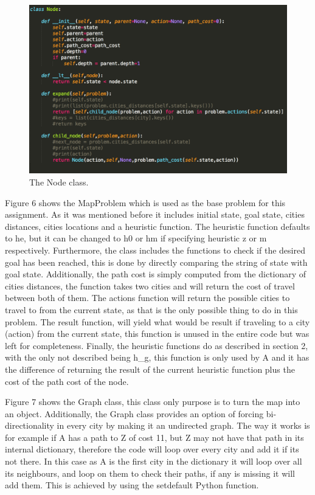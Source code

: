 \documentclass[12pt, letter]{article}
\begin{document}
\begin{figure}[htb]
  \centering
  \includegraphics[width=0.9 \textwidth]{./graphs/class_node.png}
  \caption{The Node class.}
\end{figure}

Figure 6 shows the MapProblem which is used as the base problem for this assignment. As it was mentioned before it includes initial state, goal state, cities distances, cities locations and a heuristic function. The heuristic function defaults to he, but it can be changed to h0 or hm if specifying heuristic z or m respectively. Furthermore, the class includes the functions to check if the desired goal has been reached, this is done by directly comparing the string of state with goal state. Additionally, the path cost is simply computed from the dictionary of cities distances, the function takes two cities and will return the cost of travel between both of them. The actions function will return the possible cities to travel to from the current state, as that is the only possible thing to do in this problem. The result function, will yield what would be result if traveling to a city (action) from the current state, this function is unused in the entire code but was left for completeness. Finally, the heuristic functions do as described in section 2, with the only not described being h\_g, this function is only used by A\* and it has the difference of returning the result of the current heuristic function plus the cost of the path cost of the node. 

Figure 7 shows the Graph class, this class only purpose is to turn the map into an object. Additionally, the Graph class provides an option of forcing bi-directionality in every city by making it an undirected graph. The way it works is for example if A has a path to Z of cost 11, but Z may not have that path in its internal dictionary, therefore the code will loop over every city and add it if its not there. In this case as A is the first city in the dictionary it will loop over all its neighbours, and loop on them to check their paths, if any is missing it will add them. This is achieved by using the setdefault Python function. 
\end{document}
